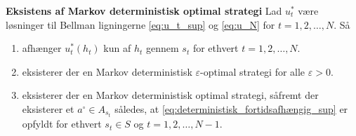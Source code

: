 \begin{thmx}\label{sæt:deterministisk_Markov_optimal_strategi} \textbf{Eksistens af Markov deterministisk optimal strategi} %
\newline
Lad $u_t^*$ være løsninger til Bellman ligningerne \eqref{eq:u_t_sup} og \eqref{eq:u_N} for $t=1, 2, \ldots, N$. Så
\begin{enumerate}
    \item afhænger $u_t^*(h_t)$ kun af $h_t$ gennem $s_t$ for ethvert $t=1, 2, \ldots, N$.
    \item eksisterer der en Markov deterministisk $\varepsilon$-optimal strategi for alle $\varepsilon>0$.
    \item eksisterer der en Markov deterministisk optimal strategi, såfremt der eksisterer et $a^\circ\in A_{s_t}$ således, at \eqref{eq:deterministisk_fortidsafhængig_sup} er opfyldt for ethvert $s_t\in S$ og $t=1, 2,\ldots, N-1$.
\end{enumerate}
\end{thmx}

